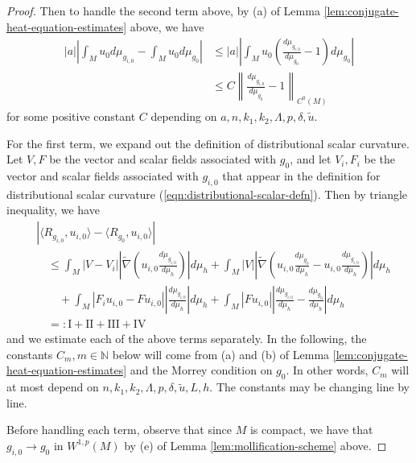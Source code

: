 \documentclass[12pt]{amsart}
\theoremstyle{plain}
\theoremstyle{plain}
\theoremstyle{definition}
\theoremstyle{remark}
\numberwithin{equation}{subsection}
\newcommand{\hdel}{\tilde{\nabla}}
\begin{document}
\begin{proof}
    Then to handle the second term above, by (a) of Lemma \ref{lem:conjugate-heat-equation-estimates} above, we have
    \begin{align*}
        |a|\left|\int_M u_0 d\mu_{g_{i,0}} - \int_M u_0 d\mu_{g_0}\right| &\leq |a|\left|\int_M u_0\left(\frac{d\mu_{g_{i,0}}}{d\mu_{g_0}} - 1\right)d\mu_{g_0}\right| \nonumber \\
        &\leq C\left\lVert \frac{d\mu_{g_{i,0}}}{d\mu_{g_0}} - 1\right\rVert_{C^0(M)}
    \end{align*}
    for some positive constant $C$ depending on $a, n, k_1, k_2, \Lambda, p, \delta, \tilde{u}$.

    For the first term, we expand out the definition of distributional scalar curvature. Let $V, F$ be the vector and scalar fields associated with $g_0$, and let $V_i, F_i$ be the vector and scalar fields associated with $g_{i,0}$ that appear in the definition for distributional scalar curvature (\ref{eqn:distributional-scalar-defn}). Then by triangle inequality, we have
    \begin{align*}
        &\left|\langle R_{g_{i,0}},u_{i,0}\rangle - \langle R_{g_0}, u_{i,0}\rangle\right| \nonumber \\
        &\quad \leq \int_M |V - V_i|\left|\hdel\left(u_{i,0}\frac{d\mu_{g_{i,0}}}{d\mu_h}\right)\right|d\mu_h + \int_M |V| \left|\hdel\left(u_{i,0}\frac{d\mu_{g_0}}{d\mu_h} - u_{i,0}\frac{d\mu_{g_{i,0}}}{d\mu_h}\right)\right|d\mu_h \nonumber \\
        &\qquad + \int_M |F_i u_{i,0} - F u_{i,0}|\left|\frac{d\mu_{g_{i,0}}}{d\mu_h}\right|d\mu_h + \int_M |Fu_{i,0}|\left|\frac{d\mu_{g_{i,0}}}{d\mu_h} - \frac{d\mu_{g_0}}{d\mu_h}\right|d\mu_h \nonumber \\
        &\quad =: \text{I} + \text{II} + \text{III} + \text{IV}
    \end{align*}
    and we estimate each of the above terms separately. In the following, the constants $C_m, m \in \mathbb{N}$ below will come from (a) and (b) of Lemma \ref{lem:conjugate-heat-equation-estimates} and the Morrey condition on $g_0$. In other words, $C_m$ will at most depend on $n, k_1, k_2, \Lambda, p, \delta, \tilde{u}, L, h$. The constants may be changing line by line.

    Before handling each term, observe that since $M$ is compact, we have that $g_{i,0} \to g_0$ in $W^{1,p}(M)$ by (e) of Lemma \ref{lem:mollification-scheme} above. 


\end{proof}
\end{document}
